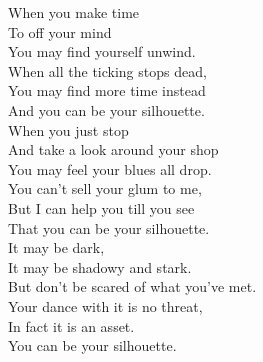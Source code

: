 





When you make time \\
To  off your mind \\
You may find yourself unwind. \\
When all the ticking stops dead, \\
You may find more time instead \\
And you can be your silhouette. \\

When you just stop \\
And take a look around your shop \\
You may feel your blues all drop. \\
You can't sell your glum to me, \\
But I can help you till you see \\
That you can be your silhouette. \\

It may be dark, \\
It may be shadowy and stark. \\
But don't be scared of what you've met. \\
Your dance with it is no threat, \\
In fact it is an asset. \\
You can be your silhouette. \\




